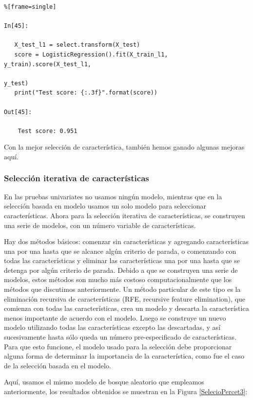 \begin{lstlisting}%[frame=single]

In[45]:

   X_test_l1 = select.transform(X_test)
   score = LogisticRegression().fit(X_train_l1, y_train).score(X_test_l1,
                                                                y_test)
   print("Test score: {:.3f}".format(score))

Out[45]:
    
    Test score: 0.951

\end{lstlisting}

Con la mejor selección de característica, también hemos ganado algunas mejoras aquí.

\subsubsection{Selección iterativa de características}

En las pruebas univariates no usamos ningún modelo, mientras que en la selección basada en modelo
usamos un solo modelo  para seleccionar características. Ahora para la  selección iterativa de características, se construyen una serie de modelos, con un número variable de características. 

 Hay dos métodos básicos: comenzar sin características y agregando características una por una hasta que se alcance algún criterio de parada, o comenzando con todas las características y eliminar las características una por una hasta que se detenga por algún criterio de parada.   Debido a que se construyen una serie de modelos, estos métodos son mucho más  costoso computacionalmente  que los métodos que discutimos anteriormente. Un método  particular de este tipo es la eliminación recursiva de características (RFE, recursive feature elimination), que comienza 
 con todas las  características, crea un modelo y descarta la característica menos importante de acuerdo con el modelo.  Luego se construye un nuevo modelo utilizando todas las 
 características excepto las descartadas, y así sucesivamente hasta sólo queda un número pre-especificado de características. Para que esto funcione, el modelo usado para la selección debe proporcionar alguna forma de determinar la importancia de la característica, como fue el caso de la selección basada en el modelo. 

Aquí, usamos el mismo modelo de bosque aleatorio que empleamos anteriormente,  los resultados obtenidos
se muestran en la Figura \ref{SelecioPercet3}:


